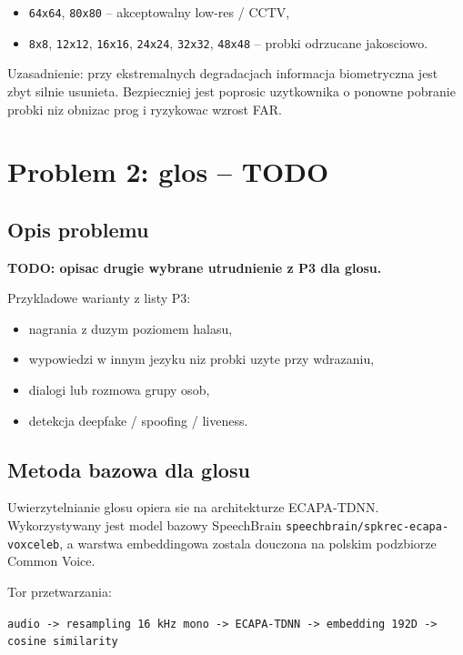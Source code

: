 \documentclass[12pt]{article}
\begin{document}
\begin{itemize}
    \item \texttt{64x64}, \texttt{80x80} -- akceptowalny low-res / CCTV,
    \item \texttt{8x8}, \texttt{12x12}, \texttt{16x16}, \texttt{24x24}, \texttt{32x32}, \texttt{48x48} -- probki odrzucane jakosciowo.
\end{itemize}

Uzasadnienie: przy ekstremalnych degradacjach informacja biometryczna jest zbyt silnie usunieta. Bezpieczniej jest poprosic uzytkownika o ponowne pobranie probki niz obnizac prog i ryzykowac wzrost FAR.

\section{Problem 2: glos -- TODO}

\subsection{Opis problemu}

\textbf{TODO: opisac drugie wybrane utrudnienie z P3 dla glosu.}

Przykladowe warianty z listy P3:

\begin{itemize}
    \item nagrania z duzym poziomem halasu,
    \item wypowiedzi w innym jezyku niz probki uzyte przy wdrazaniu,
    \item dialogi lub rozmowa grupy osob,
    \item detekcja deepfake / spoofing / liveness.
\end{itemize}

\subsection{Metoda bazowa dla glosu}

Uwierzytelnianie glosu opiera sie na architekturze ECAPA-TDNN. Wykorzystywany jest model bazowy SpeechBrain \texttt{speechbrain/spkrec-ecapa-voxceleb}, a warstwa embeddingowa zostala douczona na polskim podzbiorze Common Voice.

Tor przetwarzania:

\begin{center}
\texttt{audio -> resampling 16 kHz mono -> ECAPA-TDNN -> embedding 192D -> cosine similarity}
\end{center}
\end{document}
